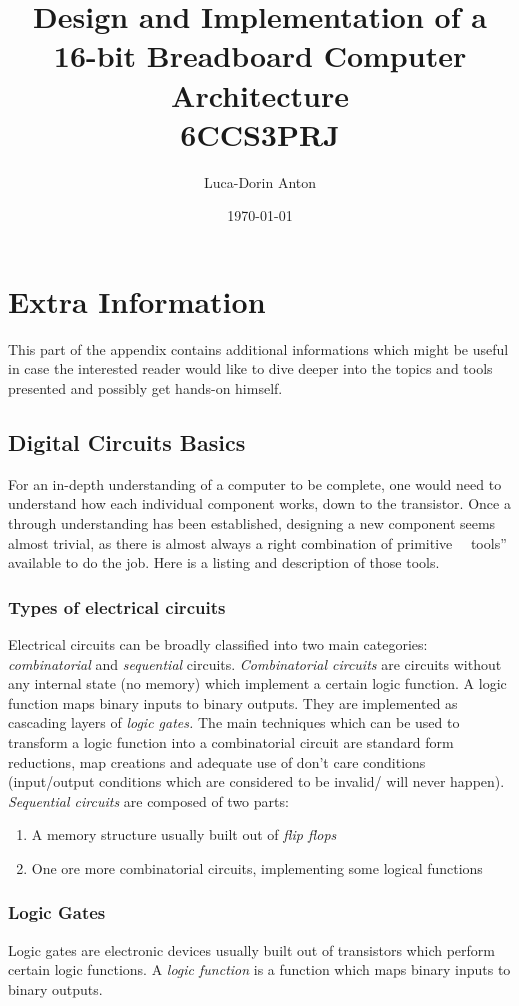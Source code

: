 \documentclass[11pt]{informatics-report}
\title{Design and Implementation of a 16-bit Breadboard Computer Architecture\\\vspace{0.2cm}6CCS3PRJ}
\date{\today}
\author{Luca-Dorin Anton}
\begin{document}
\createFrontMatter
\tableofcontents

\chapter{Extra Information}
This part of the appendix contains additional informations which might be useful in case the interested reader
would like to dive deeper into the topics and tools presented and possibly get hands-on himself.

\section{Digital Circuits Basics}
For an in-depth understanding of a computer to be complete, one would need to understand how each individual
component works, down to the transistor. Once a through understanding has been established, designing a new component
seems almost trivial, as there is almost always a right combination of primitive ~~tools'' available to do the job.
Here is a listing and description of those tools.


\subsection{Types of electrical circuits}
Electrical circuits can be broadly classified into two main categories: \emph{combinatorial} and \emph{sequential} circuits. \emph{Combinatorial circuits} are circuits without any internal state (no memory) which implement a certain logic function. A logic function maps binary inputs to binary outputs. They are implemented as cascading layers of \emph{logic gates.} The main techniques which can be used to transform a logic function into a combinatorial circuit are standard form reductions, map creations and adequate use of don't care conditions (input/output conditions which are considered to be invalid/ will never happen). \emph{Sequential circuits} are composed of two parts:
\begin{enumerate}
  \item A memory structure usually built out of \emph{flip flops}
  \item One ore more combinatorial circuits, implementing some logical functions
\end{enumerate}

\subsection{Logic Gates}
Logic gates are electronic devices usually built out of transistors which perform certain logic functions.
A \emph{logic function} is a function which maps binary inputs to binary outputs.
\end{document}
